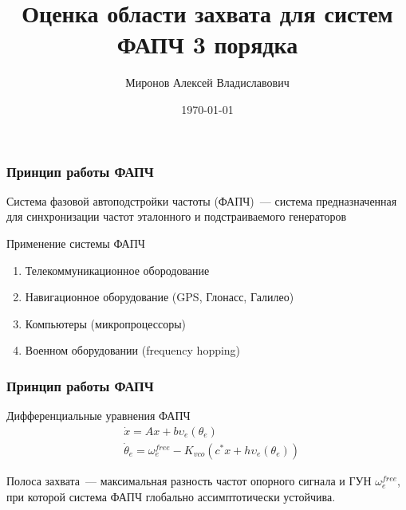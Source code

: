 \documentclass{beamer}
\title[Оценка области захвата для систем]{Оценка области захвата для систем ФАПЧ 3 порядка} %
\author{Миронов Алексей Владиславович} %
\institute[СПБГУ] %
{
Санкт-Петербургский государственный университет\\ %
\vspace{0.7cm}
    Научный руководитель:  д.ф.-м. н., профессор Юлдашев Р. В. \\
    \vspace{0.7cm}
}
\date{\today} %
\begin{document}
\begin{frame}
\titlepage %
\end{frame}


\begin{frame}
\frametitle{Принцип работы ФАПЧ}
\begin{center}
\end{center}
\begin{definition}
Система фазовой автоподстройки частоты (ФАПЧ)~--- система предназначенная для синхронизации частот эталонного и подстраиваемого генераторов
\end{definition}
Применение системы ФАПЧ
\begin{enumerate}
\item Телекоммуникационное обородование
\item Навигационное оборудование (GPS, Глонасс, Галилео)
\item Компьютеры (микропроцессоры)
\item Военном оборудовании (frequency hopping)
\end{enumerate}
\end{frame}

\begin{frame}
\frametitle{Принцип работы ФАПЧ}
Дифференциальные уравнения ФАПЧ
 \begin{equation}\label{pllequations}
 \begin{aligned}
 &\dot{x} = Ax + b\upsilon_e(\theta_e) \\
 &\dot{\theta}_e = \omega_e^{free} - K_{vco}(c^*x + h\upsilon_e(\theta_e))
 \end{aligned}
\end{equation}

\begin{definition}
Полоса захвата~--- максимальная разность частот опорного сигнала и ГУН $\omega_e^{free}$, при которой система ФАПЧ глобально ассимптотически устойчива. 
\end{definition}
\end{frame}
\end{document}
